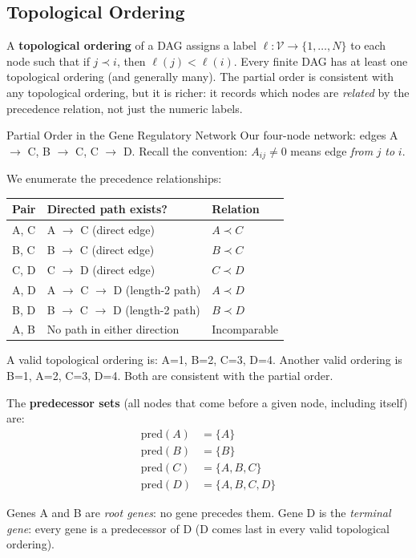 \subsection{Topological Ordering}

A \textbf{topological ordering} of a DAG assigns a label $\ell: \mathcal{V}
\to \{1, \dots, N\}$ to each node such that if $j \prec i$, then
$\ell(j) < \ell(i)$. Every finite DAG has at least one topological ordering
(and generally many). The partial order is consistent with any topological
ordering, but it is richer: it records which nodes are \emph{related} by the
precedence relation, not just the numeric labels.

\begin{examplebox}{Partial Order in the Gene Regulatory Network}
Our four-node network: edges A $\to$ C, B $\to$ C, C $\to$ D. Recall the
convention: $A_{ij} \neq 0$ means edge \emph{from} $j$ \emph{to} $i$.

We enumerate the precedence relationships:
\begin{center}
\begin{tabular}{lll}
\toprule
\textbf{Pair} & \textbf{Directed path exists?} & \textbf{Relation} \\
\midrule
A, C & A $\to$ C (direct edge) & $A \prec C$ \\
B, C & B $\to$ C (direct edge) & $B \prec C$ \\
C, D & C $\to$ D (direct edge) & $C \prec D$ \\
A, D & A $\to$ C $\to$ D (length-2 path) & $A \prec D$ \\
B, D & B $\to$ C $\to$ D (length-2 path) & $B \prec D$ \\
A, B & No path in either direction & Incomparable \\
\bottomrule
\end{tabular}
\end{center}

A valid topological ordering is: A=1, B=2, C=3, D=4. Another valid ordering
is B=1, A=2, C=3, D=4. Both are consistent with the partial order.

The \textbf{predecessor sets} (all nodes that come before a given node,
including itself) are:
\begin{align*}
    \text{pred}(A) &= \{A\} \\
    \text{pred}(B) &= \{B\} \\
    \text{pred}(C) &= \{A, B, C\} \\
    \text{pred}(D) &= \{A, B, C, D\}
\end{align*}

Genes A and B are \emph{root genes}: no gene precedes them. Gene D is the
\emph{terminal gene}: every gene is a predecessor of D (D comes last in every
valid topological ordering).
\end{examplebox}

